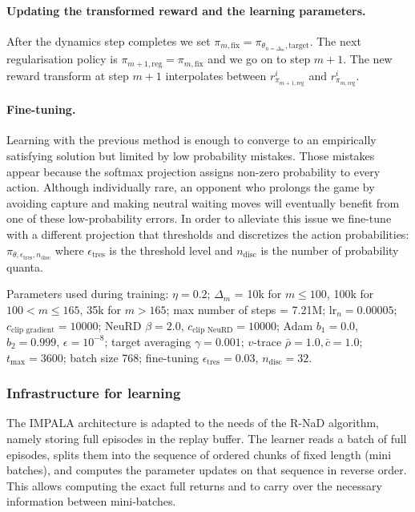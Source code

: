 \paragraph{Updating the transformed reward and the learning parameters.}
After the dynamics step completes we set $\pi_{m,\textrm{fix}}=\pi_{\theta_{n=\Delta_m}, \textrm{target}}$. The next regularisation policy is $\pi_{m+1,\textrm{reg}}=\pi_{m,\textrm{fix}}$ and we go on to step $m+1$. The new reward transform at step $m+1$ interpolates between $r^i_{\pi_{m+1,\textrm{reg}}}$ and $r^i_{\pi_{m,\textrm{reg}}}$.

\paragraph{Fine-tuning.}
Learning with the previous method is enough to converge to an empirically satisfying solution but limited by low probability mistakes. Those mistakes appear because the softmax projection assigns non-zero probability to every action. Although individually rare, an opponent who prolongs the game by avoiding capture and making neutral waiting moves will eventually benefit from one of these low-probability errors. In order to alleviate this issue we fine-tune with a different projection that thresholds and discretizes the action probabilities: $\pi_{\theta, \epsilon_\text{tres}, n_\text{disc}}$ where $\epsilon_\text{tres}$ is the threshold level and $n_\text{disc}$ is the number of probability quanta.

Parameters used during training: $\eta=0.2$; $\Delta_m$ = 10k for $m\leq 100$, 100k for $100<m\leq 165$, 35k for $m>165$; max number of steps = 7.21M; $\textrm{lr}_n=0.00005$; $c_{\textrm{clip gradient}}=10000$; NeuRD $\beta=2.0$, $c_{\textrm{clip NeuRD}}=10000$; Adam $b_1=0.0$, $b_2=0.999$, $\epsilon=10^{-8}$; target averaging $\gamma=0.001$; $v$-trace $\bar\rho=1.0, \bar c=1.0$; $t_{\textrm{max}}=3600$; batch size 768; fine-tuning $\epsilon_\text{tres}=0.03$, $n_\text{disc}=32$.

\subsubsection{Infrastructure for learning}
The IMPALA architecture is adapted to the needs of the R-NaD algorithm, namely storing full episodes in the replay buffer. The learner reads a batch of full episodes, splits them into the sequence of ordered chunks of fixed length (mini batches), and computes the parameter updates on that sequence in reverse order. This allows computing the exact full returns and to carry over the necessary information between mini-batches.


